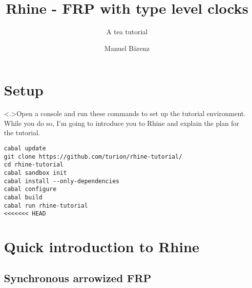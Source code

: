 \documentclass[handout]{enigtex-beamer-base}
\title{Rhine - FRP with type level clocks}
\subtitle{A tea tutorial}
\author{Manuel Bärenz}
\begin{document}
\begin{frame}
\titlepage
\end{frame}

\section{Setup}

\begin{frame}[fragile]
\note<.>{Open a console and run these commands to set up the tutorial environment.
While you do so, I'm going to introduce you to Rhine and explain the plan for the tutorial.}
\begin{verbatim}
cabal update
git clone https://github.com/turion/rhine-tutorial/
cd rhine-tutorial
cabal sandbox init
cabal install --only-dependencies
cabal configure
cabal build
cabal run rhine-tutorial
<<<<<<< HEAD
\end{verbatim}
\end{frame}

\section{Quick introduction to Rhine}

\subsection{Synchronous arrowized FRP}
\end{document}
